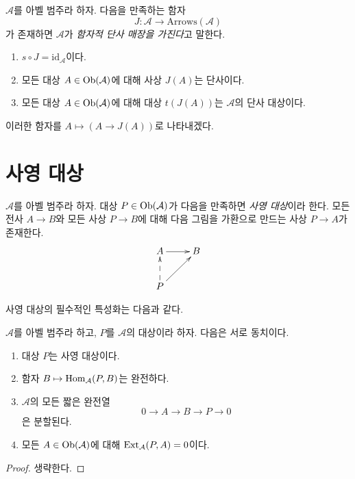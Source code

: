 \begin{definition}
\label{definition-functorial-injective-embedding}
$\mathcal{A}$를 아벨 범주라 하자. 다음을 만족하는 함자
$$
J : \mathcal{A} \longrightarrow \text{Arrows}(\mathcal{A})
$$
가 존재하면 $\mathcal{A}$가 {\it 함자적 단사 매장을 가진다}고
말한다.
\begin{enumerate}
\item $s \circ J = \text{id}_\mathcal{A}$이다.
\item 모든 대상 $A \in \mathop{\mathrm{Ob}}\nolimits(\mathcal{A})$에 대해 사상 $J(A)$는
단사이다.
\item 모든 대상 $A \in \mathop{\mathrm{Ob}}\nolimits(\mathcal{A})$에 대해 대상 $t(J(A))$는
$\mathcal{A}$의 단사 대상이다.
\end{enumerate}
이러한 함자를 $A \mapsto (A \to J(A))$로 나타내겠다.
\end{definition}

\section{사영 대상}
\label{section-projectives}

\begin{definition}
\label{definition-projective}
$\mathcal{A}$를 아벨 범주라 하자. 대상 $P \in \mathop{\mathrm{Ob}}\nolimits(\mathcal{A})$가
다음을 만족하면 {\it 사영 대상}이라 한다. 모든 전사
$A \rightarrow B$와 모든 사상 $P \to B$에 대해 다음 그림을 가환으로
만드는 사상 $P \to A$가 존재한다.
$$
\xymatrix{
A \ar[r] & B \\
P \ar@{-->}[u] \ar[ru] &
}
$$
\end{definition}

\noindent
사영 대상의 필수적인 특성화는 다음과 같다.

\begin{lemma}
\label{lemma-characterize-projectives}
$\mathcal{A}$를 아벨 범주라 하고, $P$를 $\mathcal{A}$의 대상이라 하자.
다음은 서로 동치이다.
\begin{enumerate}
\item 대상 $P$는 사영 대상이다.
\item 함자 $B \mapsto \mathop{\mathrm{Hom}}\nolimits_\mathcal{A}(P, B)$는 완전하다.
\item $\mathcal{A}$의 모든 짧은 완전열
$$
0 \to A \to B \to P \to 0
$$
은 분할된다.
\item 모든 $A \in \mathop{\mathrm{Ob}}\nolimits(\mathcal{A})$에 대해
$\mathop{\mathrm{Ext}}\nolimits_\mathcal{A}(P, A) = 0$이다.
\end{enumerate}
\end{lemma}

\begin{proof}
생략한다.
\end{proof}


